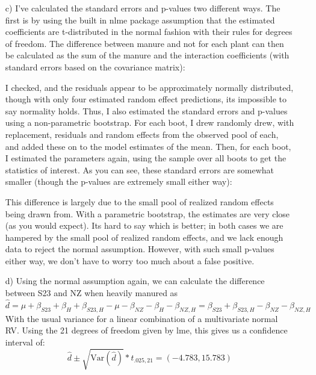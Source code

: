 \documentclass[11pt]{article}
\newcommand{\var}{\mathrm{Var}}
\theoremstyle{definition}
\begin{document}
\begin{itemize}
    \item[c)]
        I've calculated the standard errors and p-values two different ways. The first is by using the built in nlme package assumption that the estimated coefficients are t-distributed in the normal fashion with their rules for degrees of freedom. The difference between manure and not for each plant can then be calculated as the sum of the manure and the interaction coefficients (with standard errors based on the covariance matrix):
            \FloatBarrier
             
            \FloatBarrier
            I checked, and the residuals appear to be approximately normally distributed, though with only four estimated random effect predictions, its impossible to say normality holds. Thus, I also estimated the standard errors and p-values using a non-parametric bootstrap. For each boot, I drew randomly drew, with replacement, residuals and random effects from the observed pool of each, and added these on to the model estimates of the mean. Then, for each boot, I estimated the parameters again, using the sample over all boots to get the statistics of interest. As you can see, these standard errors are somewhat smaller (though the p-values are extremely small either way):
            \FloatBarrier
             
            \FloatBarrier
        This difference is largely due to the small pool of realized random effects being drawn from. With a parametric bootstrap, the estimates are very close (as you would expect). Its hard to say which is better; in both cases we are hampered by the small pool of realized random effects, and we lack enough data to reject the normal assumption. However, with such small p-values either way, we don't have to worry too much about a false positive.
        \item[d)]
            Using the normal assumption again, we can calculate the difference between S23 and NZ when heavily manured as 
            \[\hat d = \mu+\beta_{S23} + \beta_H + \beta_{S23,H} - \mu-\beta_{NZ} - \beta_H - \beta_{NZ,H} = \beta_{S23} +  \beta_{S23,H}-\beta_{NZ} - \beta_{NZ,H} \]
            With the usual variance for a linear combination of a multivariate normal RV. Using the 21 degrees of freedom given by lme, this gives us a confidence interval of:
            \[ \hat d\pm \sqrt{\var(\hat d)} * t_{.025,21} = (-4.783,15.783) \]





        
\end{itemize}
\end{document}
